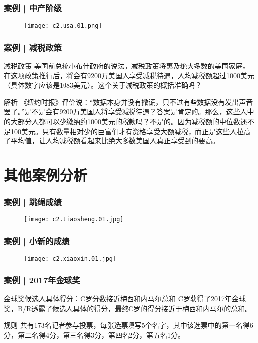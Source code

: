 \begin{frame}
  \frametitle{案例 | 中产阶级}
  \begin{figure}
    \centering
    \texttt{[image: c2.usa.01.png]}
  \end{figure}
\end{frame}

\begin{frame}
  \frametitle{案例 | 减税政策}
  \begin{block}{减税政策}
    美国前总统小布什政府的说法，减税政策将惠及绝大多数的美国家庭。在这项政策推行后，将会有9200万美国人享受减税待遇，人均减税额超过1000美元（具体数字应该是1083美元）。这个关于减税政策的概括准确吗？
  \end{block}
  \pause \pause \pause \pause
  \begin{block}{解析}
    《纽约时报》评价说：“数据本身并没有撒谎，只不过有些数据没有发出声音罢了。”是不是会有9200万美国人将享受减税待遇？答案是肯定的。那么，这些人中的大部分人都可以少缴纳约1000美元的税款吗？不是的。因为减税额的中位数还不足100美元。只有数量相对少的巨富们才有资格享受大额减税，而正是这些人拉高了平均值，让人均减税额看起来比绝大多数美国人真正享受到的要高。
  \end{block}
\end{frame}

\section{其他案例分析}
\begin{frame}
  \frametitle{案例 | 跳绳成绩}
  \begin{figure}
    \centering
    \texttt{[image: c2.tiaosheng.01.jpg]}
  \end{figure}
\end{frame}

\begin{frame}
  \frametitle{案例 | 小新的成绩}
  \begin{figure}
    \centering
    \texttt{[image: c2.xiaoxin.01.jpg]}
  \end{figure}
\end{frame}

\begin{frame}
  \frametitle{案例 | 2017年金球奖}
  \begin{block}{金球奖候选人具体得分：C罗分数接近梅西和内马尔总和}
    C罗获得了2017年金球奖，B/R透露了候选人具体的得分，最终C罗的得分接近于梅西和内马尔的总和。
  \end{block}
  \vspace{-0.8em}
  \pause
  \begin{figure}
    \centering
  \end{figure}
  \pause
  \vspace{-1em}
  \begin{block}{规则}
    共有173名记者参与投票，每张选票填写5个名字，其中该选票中的第一名得6分，第二名得4分，第三名得3分，第四名2分，第五名1分。
  \end{block}
\end{frame}

